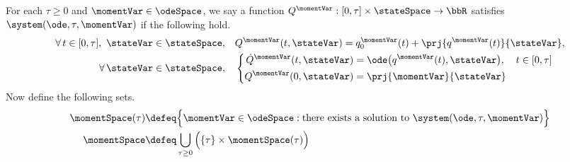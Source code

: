 \begin{definition}
  \label{definition:momentSpace}
  For each $\tau \geq 0$ and $\momentVar \in \odeSpace$, we say a function $Q^\momentVar: [0,\tau] \times \stateSpace \rightarrow \bbR$ satisfies $\system(\ode, \tau,\momentVar)$ if the following hold.
  \begin{align}
    \label{definition:momentSpace-affine}
    \forall\, t \in [0,\tau], ~ \stateVar \in \stateSpace, \quad
    & Q^\momentVar(t, \stateVar) = q_0^\momentVar(t) + \prj{q^\momentVar(t)}{\stateVar},  \\
    \label{definition:momentSpace-ode}
    \forall\, \stateVar \in \stateSpace, \quad
    & \left\{\begin{aligned}
      \dot Q^\momentVar(t, \stateVar) &= \ode\big(q^\momentVar(t), \stateVar\big), & t \in [0,\tau] \\
      Q^\momentVar(0, \stateVar) &= \prj{\momentVar}{\stateVar}
    \end{aligned}\right.
  \end{align}
  Now define the following sets.
  \begin{align}
    \momentSpace(\tau) &\defeq \Big\{ \momentVar \in \odeSpace : \text{there exists a solution to } \system(\ode,\tau,\momentVar) \Big\} \\
    \momentSpace &\defeq \bigcup_{\tau\geq 0} \Big( \{\tau\} \times \momentSpace(\tau) \Big)
  \end{align}
\end{definition}
